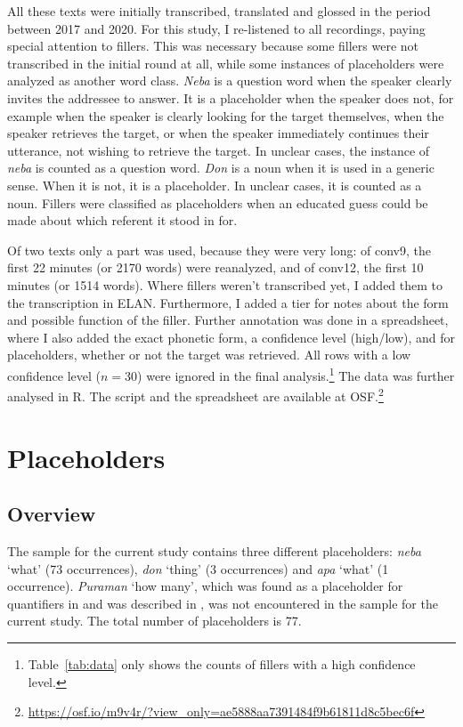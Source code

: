 \documentclass[output=paper,colorlinks,citecolor=brown
\ChapterDOI{10.5281/zenodo.15697587}
]{langscibook}
\begin{document}
All these texts were initially transcribed, translated and glossed in the period between 2017 and 2020. For this study, I re-listened to all recordings, paying special attention to fillers. This was necessary because some fillers were not transcribed in the initial round at all, while some instances of placeholders were analyzed as another word class. \textit{Neba} is a question word when the speaker clearly invites the addressee to answer. It is a placeholder when the speaker does not, for example when the speaker is clearly looking for the target themselves, when the speaker retrieves the target, or when the speaker immediately continues their utterance, not wishing to retrieve the target. In unclear cases, the instance of \textit{neba} is counted as a question word. \textit{Don} is a noun when it is used in a generic sense. When it is not, it is a placeholder. In unclear cases, it is counted as a noun. Fillers were classified as placeholders when an educated guess could be made about which referent it stood in for.

Of two texts only a part was used, because they were very long: of conv9, the first 22 minutes (or 2170 words) were reanalyzed, and of conv12, the first 10 minutes (or 1514 words). Where fillers weren't transcribed yet, I added them to the transcription in ELAN. Furthermore, I added a tier for notes about the form and possible function of the filler. Further annotation was done in a spreadsheet, where I also added the exact phonetic form, a confidence level (high/low), and for placeholders, whether or not the target was retrieved. All rows with a low confidence level ($n = 30$) were ignored in the final analysis.\footnote{Table~\ref{tab:data} only shows the counts of fillers with a high confidence level.} The data was further analysed in R. The script and the spreadsheet are available at OSF.\footnote{\url{https://osf.io/m9v4r/?view_only=ae5888aa7391484f9b61811d8c5bec6f}}

\section{Placeholders}
\label{sec:ph}
\subsection{Overview}
The sample for the current study contains three different placeholders: \textit{neba} `what' (73 occurrences), \textit{don} `thing' (3 occurrences) and \textit{apa} `what' (1 occurrence). \textit{Puraman} `how many', which was found as a placeholder for quantifiers in \citet{visser2022} and was described in , was not encountered in the sample for the current study. The total number of placeholders is 77.
\end{document}
